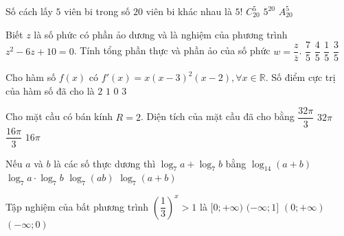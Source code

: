\begin{ex}%
Số cách lấy $5$ viên bi trong số $20$ viên bi khác nhau là
\choice
{$5!$}
{\True $C_{20}^5$}
{$5^{20}$}
{$A_{20}^5$}

\end{ex}
\begin{ex}%
Biết $z$ là số phức có phần ảo dương và là nghiệm của phương trình $z^2-6 z+10=0$. Tính tổng phần thực và phần ảo của số phức $w=\dfrac{z}{\bar{z}}$.
\choice
{\True $\dfrac{7}{5}$}
{$\dfrac{4}{5}$}
{$\dfrac{1}{5}$}
{$\dfrac{3}{5}$}

\end{ex}
\begin{ex}%
Cho hàm số $f(x)$ có $f'(x)=x(x-3)^2(x-2), \forall x \in \mathbb{R}$. Số điểm cực trị của hàm số đã cho là
\choice
{\True $2$}
{$1$}
{$0$}
{$3$}

\end{ex}
\begin{ex}%
Cho mặt cầu có bán kính $R=2$. Diện tích của mặt cầu đã cho bằng
\choice
{$\dfrac{32\pi}{3}$}
{$32\pi$}
{$\dfrac{16\pi}{3}$}
{\True $16\pi$}

\end{ex}
\begin{ex}%
Nếu $a$ và $b$ là các số thực dương thì $\log_7 a+\log_7 b$ bằng
\choice
{$\log_{14}(a+b)$}
{$\log_7 a \cdot \log_7 b$}
{\True $\log_7(a b)$}
{$\log_7(a+b)$}

\end{ex}
\begin{ex}%
Tập nghiệm của bất phương trình $\left(\dfrac{1}{3}\right)^{x}>1$ là
\choice
{$[0;+\infty)$}
{$(-\infty; 1]$}
{$(0;+\infty)$}
{\True $(-\infty; 0)$}

\end{ex}

